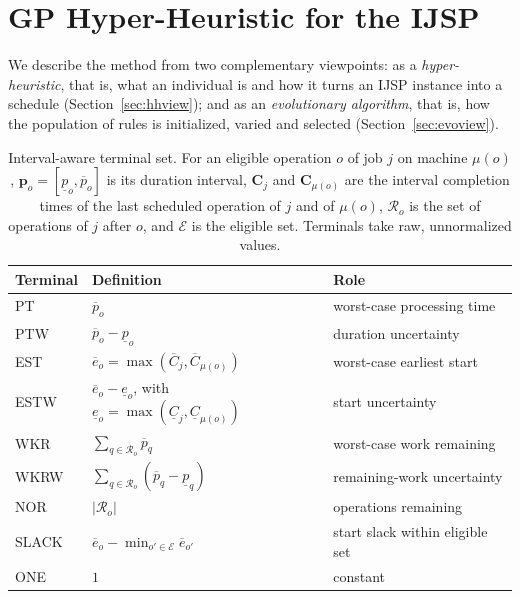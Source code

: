 \documentclass[preprint,number,sort&compress,12pt]{elsarticle}
\begin{document}
\section{GP Hyper-Heuristic for the IJSP}
\label{sec:method}

We describe the method from two complementary viewpoints: as a
\emph{hyper-heuristic}, that is, what an individual is and how it turns
an IJSP instance into a schedule (Section~\ref{sec:hhview}); and as an
\emph{evolutionary algorithm}, that is, how the population of rules is
initialized, varied and selected (Section~\ref{sec:evoview}).

\begin{table}[!t]
\centering\small
\caption{Interval-aware terminal set. For an eligible operation $o$ of job $j$
on machine $\mu(o)$, $\mathbf{p}_o = [\underline{p}_o, \overline{p}_o]$ is
its duration interval, $\mathbf{C}_j$ and $\mathbf{C}_{\mu(o)}$ are the
interval completion times of the last scheduled operation of $j$ and of
$\mu(o)$, $\mathcal{R}_o$ is the set of operations of $j$ after $o$, and
$\mathcal{E}$ is the eligible set. Terminals take raw, unnormalized
values.}
\label{tab:terminals}
\begin{tabular}{lll}
\toprule
Terminal & Definition & Role \\
\midrule
PT   & $\overline{p}_o$ & worst-case processing time \\
PTW  & $\overline{p}_o-\underline{p}_o$ & duration uncertainty \\
EST  & $\overline{e}_o = \max(\overline{C}_j, \overline{C}_{\mu(o)})$ &
worst-case earliest start \\
ESTW & $\overline{e}_o - \underline{e}_o$, with
$\underline{e}_o=\max(\underline{C}_j,\underline{C}_{\mu(o)})$ &
start uncertainty \\
WKR  & $\sum_{q\in\mathcal{R}_o}\overline{p}_q$ & worst-case work
remaining \\
WKRW & $\sum_{q\in\mathcal{R}_o}(\overline{p}_q-\underline{p}_q)$ &
remaining-work uncertainty \\
NOR  & $|\mathcal{R}_o|$ & operations remaining \\
SLACK& $\overline{e}_o - \min_{o'\in\mathcal{E}}\overline{e}_{o'}$ &
start slack within eligible set \\
ONE  & $1$ & constant \\
\bottomrule
\end{tabular}
\end{table}
\end{document}
